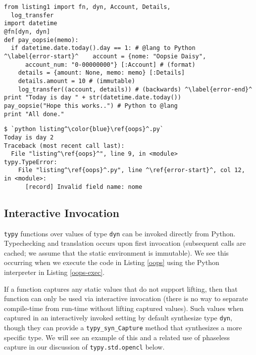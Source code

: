 \documentclass[preprint,10pt]{sigplanconf}
\newcommand{\lip}[1]{\lstinline[language=Python,basicstyle=\ttfamily\small,deletendkeywords={tuple,buffer,map}]{#1}}
\begin{document}
\begin{codelisting}[t]
\begin{lstlisting}
from listing1 import fn, dyn, Account, Details, 
  log_transfer
import datetime
@fn[dyn, dyn]
def pay_oopsie(memo):
  if datetime.date.today().day == 1: # @lang to Python
^\label{error-start}^    account = {nome: "Oopsie Daisy", 
      account_num: "0-00000000"} [:Account] # (format)
    details = {amount: None, memo: memo} [:Details]
    details.amount = 10 # (immutable)
    log_transfer((account, details)) # (backwards) ^\label{error-end}^
print "Today is day " + str(datetime.date.today())
pay_oopsie("Hope this works..") # Python to @lang
print "All done."
\end{lstlisting}
\caption{[\texttt{listing\ref{oops}.py}] Lines \ref{error-start}-\ref{error-end} each have a type error.}
\label{oops}
\end{codelisting}
\begin{codelisting}[t]
\begin{lstlisting}[style=Bash]
$ `python listing^\color{blue}\ref{oops}^.py`
Today is day 2
Traceback (most recent call last):
  File "listing^\ref{oops}^", line 9, in <module>
typy.TypeError: 
    File "listing^\ref{oops}^.py", line ^\ref{error-start}^, col 12, in <module>: 
      [record] Invalid field name: nome
\end{lstlisting}
\caption{Execution never proceeds into a function with a type error when using \texttt{typy} for implicit compilation.}
\label{oops-exec}
\end{codelisting}

\subsection{Interactive Invocation}\label{interactive} \texttt{typy} functions over values of type \lip{dyn} can be invoked directly from Python. Typechecking and translation occurs upon first invocation (subsequent calls are cached; we assume that the static environment is immutable). We see this occurring when we execute the code in Listing \ref{oops} using the Python interpreter in Listing \ref{oops-exec}. 

If a function captures any static values that do not support lifting, then that function can only be used via interactive invocation (there is no way to separate compile-time from run-time without lifting captured values). Such values when captured in an interactively invoked setting by default synthesize type \lip{dyn}, though they can provide a \lip{typy_syn_Capture} method that synthesizes a more specific type. We will see an example of this and a related use of phaseless capture in our discussion of \lip{typy.std.opencl} below.
\end{document}
